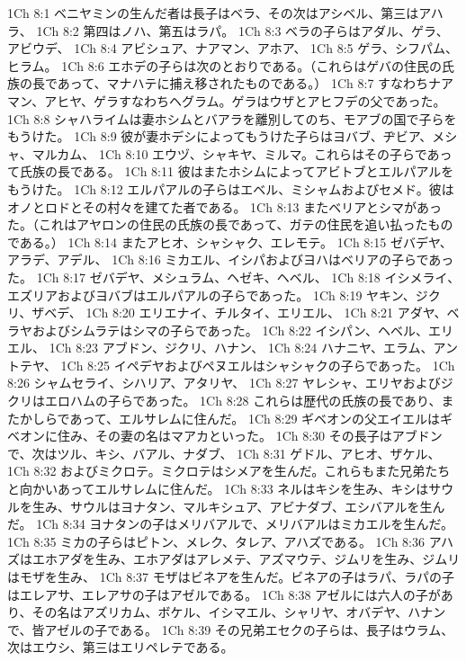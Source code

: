 1Ch 8:1  ベニヤミンの生んだ者は長子はベラ、その次はアシベル、第三はアハラ、
1Ch 8:2  第四はノハ、第五はラパ。
1Ch 8:3  ベラの子らはアダル、ゲラ、アビウデ、
1Ch 8:4  アビシュア、ナアマン、アホア、
1Ch 8:5  ゲラ、シフパム、ヒラム。
1Ch 8:6  エホデの子らは次のとおりである。（これらはゲバの住民の氏族の長であって、マナハテに捕え移されたものである。）
1Ch 8:7  すなわちナアマン、アヒヤ、ゲラすなわちヘグラム。ゲラはウザとアヒフデの父であった。
1Ch 8:8  シャハライムは妻ホシムとバアラを離別してのち、モアブの国で子らをもうけた。
1Ch 8:9  彼が妻ホデシによってもうけた子らはヨバブ、ヂビア、メシャ、マルカム、
1Ch 8:10  エウヅ、シャキヤ、ミルマ。これらはその子らであって氏族の長である。
1Ch 8:11  彼はまたホシムによってアビトブとエルパアルをもうけた。
1Ch 8:12  エルパアルの子らはエベル、ミシャムおよびセメド。彼はオノとロドとその村々を建てた者である。
1Ch 8:13  またベリアとシマがあった。（これはアヤロンの住民の氏族の長であって、ガテの住民を追い払ったものである。）
1Ch 8:14  またアヒオ、シャシャク、エレモテ。
1Ch 8:15  ゼバデヤ、アラデ、アデル、
1Ch 8:16  ミカエル、イシパおよびヨハはベリアの子らであった。
1Ch 8:17  ゼバデヤ、メシュラム、ヘゼキ、ヘベル、
1Ch 8:18  イシメライ、エズリアおよびヨバブはエルパアルの子らであった。
1Ch 8:19  ヤキン、ジクリ、ザベデ、
1Ch 8:20  エリエナイ、チルタイ、エリエル、
1Ch 8:21  アダヤ、ベラヤおよびシムラテはシマの子らであった。
1Ch 8:22  イシパン、ヘベル、エリエル、
1Ch 8:23  アブドン、ジクリ、ハナン、
1Ch 8:24  ハナニヤ、エラム、アントテヤ、
1Ch 8:25  イペデヤおよびペヌエルはシャシャクの子らであった。
1Ch 8:26  シャムセライ、シハリア、アタリヤ、
1Ch 8:27  ヤレシャ、エリヤおよびジクリはエロハムの子らであった。
1Ch 8:28  これらは歴代の氏族の長であり、またかしらであって、エルサレムに住んだ。
1Ch 8:29  ギベオンの父エイエルはギベオンに住み、その妻の名はマアカといった。
1Ch 8:30  その長子はアブドンで、次はツル、キシ、バアル、ナダブ、
1Ch 8:31  ゲドル、アヒオ、ザケル、
1Ch 8:32  およびミクロテ。ミクロテはシメアを生んだ。これらもまた兄弟たちと向かいあってエルサレムに住んだ。
1Ch 8:33  ネルはキシを生み、キシはサウルを生み、サウルはヨナタン、マルキシュア、アビナダブ、エシバアルを生んだ。
1Ch 8:34  ヨナタンの子はメリバアルで、メリバアルはミカエルを生んだ。
1Ch 8:35  ミカの子らはピトン、メレク、タレア、アハズである。
1Ch 8:36  アハズはエホアダを生み、エホアダはアレメテ、アズマウテ、ジムリを生み、ジムリはモザを生み、
1Ch 8:37  モザはビネアを生んだ。ビネアの子はラパ、ラパの子はエレアサ、エレアサの子はアゼルである。
1Ch 8:38  アゼルには六人の子があり、その名はアズリカム、ボケル、イシマエル、シャリヤ、オバデヤ、ハナンで、皆アゼルの子である。
1Ch 8:39  その兄弟エセクの子らは、長子はウラム、次はエウシ、第三はエリペレテである。
